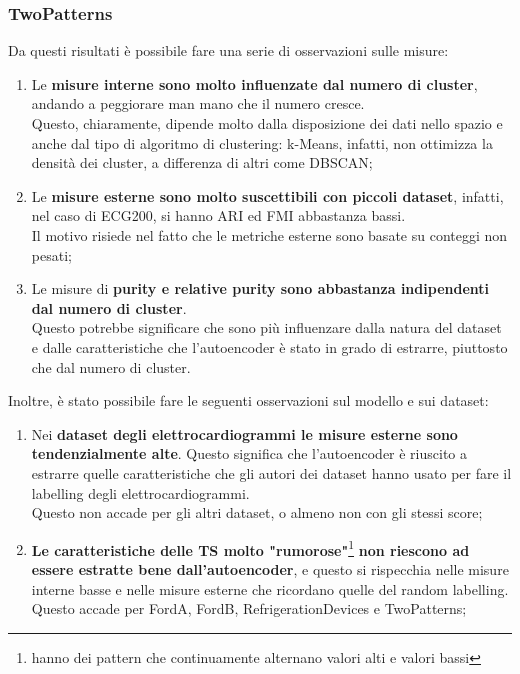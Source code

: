 \subsubsection{TwoPatterns}
\begin{center}
\end{center}

Da questi risultati è possibile fare una serie di osservazioni sulle misure:
\begin{enumerate}
	\item Le \textbf{misure interne sono molto influenzate dal numero di cluster}, andando a peggiorare man mano che il numero cresce.\\
	Questo, chiaramente, dipende molto dalla disposizione dei dati nello spazio e anche dal tipo di algoritmo di clustering: k-Means, infatti, non ottimizza la densità dei cluster, a differenza di altri come DBSCAN;
	\item Le \textbf{misure esterne sono molto suscettibili con piccoli dataset}, infatti, nel caso di ECG200, si hanno ARI ed FMI abbastanza bassi.\\
	Il motivo risiede nel fatto che le metriche esterne sono basate su conteggi non pesati;
	\item Le misure di \textbf{purity e relative purity sono abbastanza indipendenti dal numero di cluster}.\\
	Questo potrebbe significare che sono più influenzare dalla natura del dataset e dalle caratteristiche che l'autoencoder è stato in grado di estrarre, piuttosto che dal numero di cluster.
\end{enumerate}

Inoltre, è stato possibile fare le seguenti osservazioni sul modello e sui dataset:
\begin{enumerate}	
	\item Nei \textbf{dataset degli elettrocardiogrammi le misure esterne sono tendenzialmente alte}. Questo significa che l'autoencoder è riuscito a estrarre quelle caratteristiche che gli autori dei dataset hanno usato per fare il labelling degli elettrocardiogrammi.\\
	Questo non accade per gli altri dataset, o almeno non con gli stessi score;
	\item \textbf{Le caratteristiche delle TS molto "rumorose"}\footnote{hanno dei pattern che continuamente alternano valori alti e valori bassi} \textbf{non riescono ad essere estratte bene dall'autoencoder}, e questo si rispecchia nelle misure interne basse e nelle misure esterne che ricordano quelle del random labelling. Questo accade per FordA, FordB, RefrigerationDevices e TwoPatterns;
\end{enumerate}